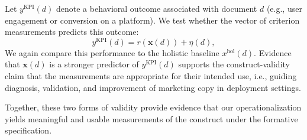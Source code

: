 Let $y^{\text{KPI}}(d)$ denote a behavioral outcome associated with document $d$ (e.g., user engagement or conversion on a platform). We test whether the vector of criterion measurements predicts this outcome:
\begin{equation}
    y^{\text{KPI}}(d) = r(\mathbf{x}(d)) + \eta(d),
\end{equation}
We again compare this performance to the holistic baseline $x^{\text{hol}}(d)$. Evidence that $\mathbf{x}(d)$ is a stronger predictor of $y^{\text{KPI}}(d)$ supports the construct-validity claim that the measurements are appropriate for their intended use, i.e., guiding diagnosis, validation, and improvement of marketing copy in deployment settings.

Together, these two forms of validity provide evidence that our operationalization yields meaningful and usable measurements of the construct under the formative specification. 

